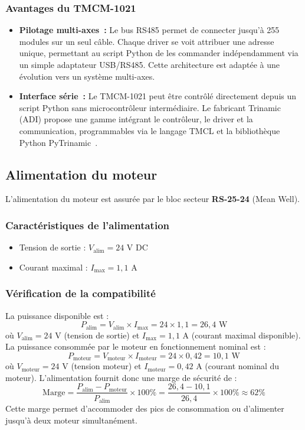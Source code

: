 \subsubsection{Avantages du TMCM-1021}
\begin{itemize}
    \item \textbf{Pilotage multi-axes~:} Le bus RS485 permet de connecter jusqu'à 255 modules sur un seul câble. Chaque driver se voit attribuer une adresse unique, permettant au script Python de les commander indépendamment via un simple adaptateur USB/RS485. Cette architecture est adaptée à une évolution vers un système multi-axes.
    
    \item \textbf{Interface série~:} Le TMCM-1021 peut être contrôlé directement depuis un script Python sans microcontrôleur intermédiaire. Le fabricant Trinamic (ADI) propose une gamme intégrant le contrôleur, le driver et la communication, programmables via le langage TMCL et la bibliothèque Python PyTrinamic~\cite{trinamic_pytrinamic}.
\end{itemize}
\subsection{Alimentation du moteur}
L'alimentation du moteur est assurée par le bloc secteur \textbf{RS-25-24} (Mean Well).
\subsubsection{Caractéristiques de l'alimentation}
\begin{itemize}
    \item Tension de sortie : $V_{\text{alim}} = 24$ V DC
    \item Courant maximal : $I_{\text{max}} = 1,1$ A
\end{itemize}
\subsubsection{Vérification de la compatibilité}
La puissance disponible est :
\begin{equation}
    P_{\text{alim}} = V_{\text{alim}} \times I_{\text{max}} = 24 \times 1,1 = 26,4 \text{ W}
    \label{eq:puissance_alim}
\end{equation}
\noindent où $V_{\text{alim}} = 24$ V (tension de sortie) et $I_{\text{max}} = 1,1$ A (courant maximal disponible).
La puissance consommée par le moteur en fonctionnement nominal est :
\begin{equation}
    P_{\text{moteur}} = V_{\text{moteur}} \times I_{\text{moteur}} = 24 \times 0,42 = 10,1 \text{ W}
    \label{eq:puissance_moteur}
\end{equation}
\noindent où $V_{\text{moteur}} = 24$ V (tension moteur) et $I_{\text{moteur}} = 0,42$ A (courant nominal du moteur).
L'alimentation fournit donc une marge de sécurité de :
\begin{equation}
    \text{Marge} = \frac{P_{\text{alim}} - P_{\text{moteur}}}{P_{\text{alim}}} \times 100\% = \frac{26,4 - 10,1}{26,4} \times 100\% \approx 62\%
    \label{eq:marge_puissance}
\end{equation}
Cette marge permet d'accommoder des pics de consommation ou d'alimenter jusqu'à deux moteur simultanément.
